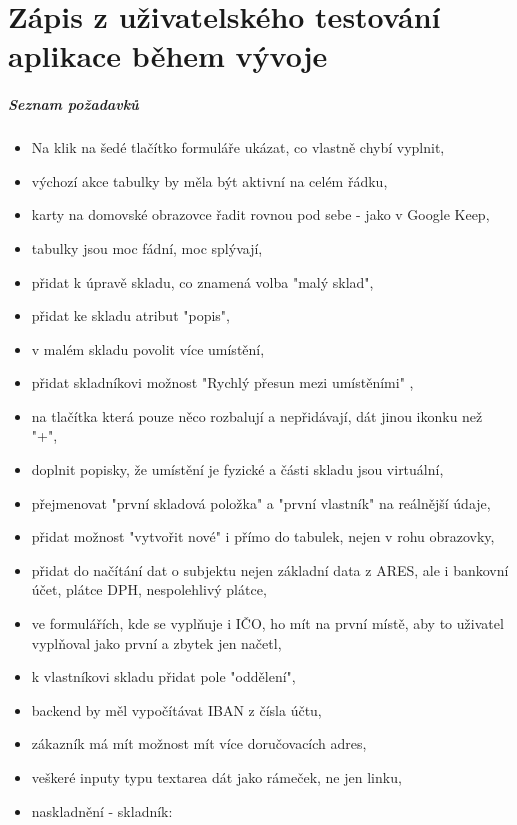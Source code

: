 \chapter{Zápis z uživatelského testování aplikace během vývoje} \label{ap:testing_notes}

\paragraph{Seznam požadavků}

\begin{itemize}
	\item Na klik na šedé tlačítko formuláře ukázat, co vlastně chybí vyplnit,
	\item výchozí akce tabulky by měla být aktivní na celém řádku,
	\item karty na domovské obrazovce řadit rovnou pod sebe - jako v Google Keep,
	\item tabulky jsou moc fádní, moc splývají,
	\item přidat k úpravě skladu, co znamená volba "malý sklad",
	\item přidat ke skladu atribut "popis",
	\item v malém skladu povolit více umístění,
	\item přidat skladníkovi možnost "Rychlý přesun mezi umístěními" ,
	\item na tlačítka která pouze něco rozbalují a nepřidávají, dát jinou ikonku než "+",
	\item doplnit popisky, že umístění je fyzické a části skladu jsou virtuální,
	\item přejmenovat "první skladová položka" a "první vlastník" na reálnější údaje,
	\item přidat možnost "vytvořit nové" i přímo do tabulek, nejen v rohu obrazovky,
	\item přidat do načítání dat o subjektu nejen základní data z ARES, ale i bankovní účet, plátce DPH, nespolehlivý plátce,
	\item ve formulářích, kde se vyplňuje i IČO, ho mít na první místě, aby to uživatel vyplňoval jako první a zbytek jen načetl,
	\item k vlastníkovi skladu přidat pole "oddělení",
	\item backend by měl vypočítávat IBAN z čísla účtu,
	\item zákazník má mít možnost mít více doručovacích adres,
	\item veškeré inputy typu textarea dát jako rámeček, ne jen linku,
	\item naskladnění - skladník:

\end{itemize}
